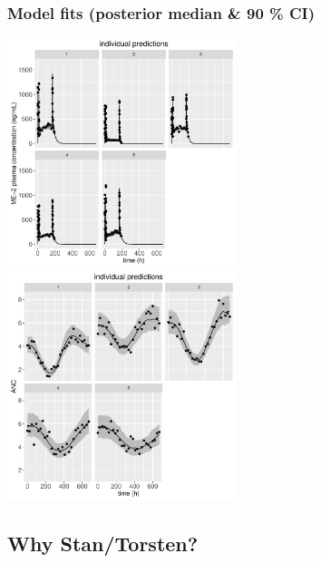 \documentclass{beamer}
\begin{document}
\begin{frame}
  \frametitle{Model fits (posterior median \& 90 \% CI)}
  
\begin{center}
\includegraphics[width=0.5\textwidth]{graphics/neutropenia1TorstenNcpPlots018.pdf}
\includegraphics[width=0.5\textwidth]{graphics/neutropenia1TorstenNcpPlots019.pdf}
\end{center}

\end{frame}





\subsection{Why Stan/Torsten?}
\end{document}
